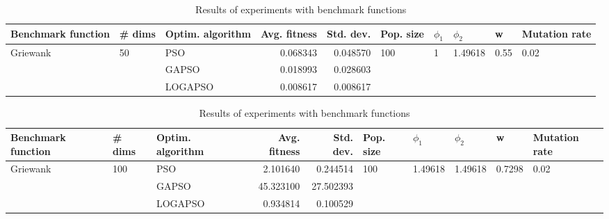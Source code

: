 \documentclass{article}
\begin{document}
\begin{table}
\centering
\caption{Results of experiments with benchmark functions}
\begin{tabular}{lllrrlllll}
\toprule
       Benchmark function &             \# dims & Optim. algorithm &  Avg. fitness &  Std. dev. &            Pop. size &         $\phi_{1}$ &               $\phi_{2}$ &                     w &         Mutation rate \\
\midrule
\multirow{3}{*}{Griewank} & \multirow{3}{*}{50} &              PSO &      0.068343 &   0.048570 & \multirow{3}{*}{100} & \multirow{3}{*}{1} & \multirow{3}{*}{1.49618} & \multirow{3}{*}{0.55} & \multirow{3}{*}{0.02} \\
                          &                     &            GAPSO &      0.018993 &   0.028603 &                      &                    &                          &                       &                       \\
                          &                     &          LOGAPSO &      0.008617 &   0.008617 &                      &                    &                          &                       &                       \\
\bottomrule
\end{tabular}
\end{table}
\begin{table}
\centering
\caption{Results of experiments with benchmark functions}
\begin{tabular}{lllrrlllll}
\toprule
       Benchmark function &              \# dims & Optim. algorithm &  Avg. fitness &  Std. dev. &            Pop. size &               $\phi_{1}$ &               $\phi_{2}$ &                       w &         Mutation rate \\
\midrule
\multirow{3}{*}{Griewank} & \multirow{3}{*}{100} &              PSO &      2.101640 &   0.244514 & \multirow{3}{*}{100} & \multirow{3}{*}{1.49618} & \multirow{3}{*}{1.49618} & \multirow{3}{*}{0.7298} & \multirow{3}{*}{0.02} \\
                          &                      &            GAPSO &     45.323100 &  27.502393 &                      &                          &                          &                         &                       \\
                          &                      &          LOGAPSO &      0.934814 &   0.100529 &                      &                          &                          &                         &                       \\
\bottomrule
\end{tabular}
\end{table}
\end{document}
